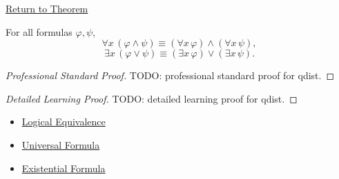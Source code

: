 \newpage
{}
\label{prf:qdist}

\begin{remark*}[Return]
\hyperref[thm:qdist]{Return to Theorem}
\end{remark*}

\begin{theorem*}
For all formulas \(\varphi,\psi\),
\[
\forall x\,(\varphi\land\psi)
\equiv
(\forall x\,\varphi)\land(\forall x\,\psi),
\]
\[
\exists x\,(\varphi\lor\psi)
\equiv
(\exists x\,\varphi)\lor(\exists x\,\psi).
\]
\end{theorem*}

\begin{proof}[Professional Standard Proof]
\LRAProofBodyStart
TODO: professional standard proof for qdist.
\end{proof}

\begin{proof}[Detailed Learning Proof]
\LRAProofBodyStart
TODO: detailed learning proof for qdist.
\end{proof}

\begin{remark*}
\end{remark*}

\begin{dependencies}
\begin{itemize}
  \item \hyperref[def:log-equiv]{Logical Equivalence}
  \item \hyperref[def:universal-q]{Universal Formula}
  \item \hyperref[def:existential-q]{Existential Formula}
\end{itemize}
\end{dependencies}

\clearpage
